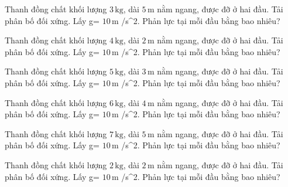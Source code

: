 \begin{ex}
Thanh đồng chất khối lượng $3\,\text{kg}$, dài $5\,\text{m}$ nằm ngang, được đỡ ở hai đầu. Tải phân bố đối xứng. Lấy g= $10\,\text{m}$ /s^2. Phản lực tại mỗi đầu bằng bao nhiêu?
\end{ex}

\begin{ex}
Thanh đồng chất khối lượng $4\,\text{kg}$, dài $2\,\text{m}$ nằm ngang, được đỡ ở hai đầu. Tải phân bố đối xứng. Lấy g= $10\,\text{m}$ /s^2. Phản lực tại mỗi đầu bằng bao nhiêu?
\end{ex}

\begin{ex}
Thanh đồng chất khối lượng $5\,\text{kg}$, dài $3\,\text{m}$ nằm ngang, được đỡ ở hai đầu. Tải phân bố đối xứng. Lấy g= $10\,\text{m}$ /s^2. Phản lực tại mỗi đầu bằng bao nhiêu?
\end{ex}

\begin{bt}
Thanh đồng chất khối lượng $6\,\text{kg}$, dài $4\,\text{m}$ nằm ngang, được đỡ ở hai đầu. Tải phân bố đối xứng. Lấy g= $10\,\text{m}$ /s^2. Phản lực tại mỗi đầu bằng bao nhiêu?
\end{bt}

\begin{bt}
Thanh đồng chất khối lượng $7\,\text{kg}$, dài $5\,\text{m}$ nằm ngang, được đỡ ở hai đầu. Tải phân bố đối xứng. Lấy g= $10\,\text{m}$ /s^2. Phản lực tại mỗi đầu bằng bao nhiêu?
\end{bt}

\begin{bt}
Thanh đồng chất khối lượng $2\,\text{kg}$, dài $2\,\text{m}$ nằm ngang, được đỡ ở hai đầu. Tải phân bố đối xứng. Lấy g= $10\,\text{m}$ /s^2. Phản lực tại mỗi đầu bằng bao nhiêu?
\end{bt}

